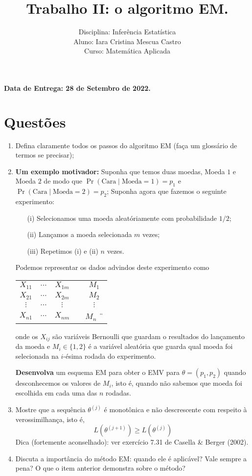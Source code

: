 \documentclass[a4paper,10pt, notitlepage]{report}
\title{Trabalho II: o algoritmo EM.}
\author{Disciplina: Inferência Estatística \\ Aluno: Iara Cristina Mescua Castro \\ Curso: Matemática Aplicada}
\begin{document}
	\maketitle
	
	\textbf{Data de Entrega: 28 de Setembro de 2022.}
	
	\section*{Questões}
	\begin{enumerate}
		\item Defina claramente todos os passos do algoritmo EM (faça um glossário de termos se precisar);
		\item \textbf{Um exemplo motivador:} Suponha que temos duas moedas, Moeda $1$ e Moeda $2$ de modo que $\operatorname{Pr}(\text{Cara} \mid \text{Moeda} = 1) = p_1$ e $\operatorname{Pr}(\text{Cara} \mid \text{Moeda} = 2) = p_2$; 
		Suponha agora que fazemos o seguinte experimento:
		\begin{itemize}
			\item[(i)] Selecionamos uma moeda aleatóriamente com probabilidade $1/2$;
			\item[(ii)] Lançamos a moeda selecionada $m$ vezes;
			\item[(iii)] Repetimos (i) e (ii) $n$ vezes.
		\end{itemize}
		Podemos representar os dados advindos deste experimento como 
		\begin{center}
			\begin{tabular}{ c c c c c}
				$X_{11}$ & $\ldots$ & $X_{1m}$ & & $M_1$  \\ 
				$X_{21}$ & $\ldots$ & $X_{2m}$ & & $M_2$  \\
				$\vdots$ & $\ldots$ & $\vdots$ & & $\vdots$  \\
				$X_{n1}$ & $\ldots$ & $X_{nm}$ & & $M_n$ ¨
			\end{tabular}
		\end{center}
		
		onde os $X_{ij}$ são variáveis Bernoulli que guardam o resultados do lançamento da moeda  e $M_i \in \{ 1, 2\}$ é a variável aleatória que guarda qual moeda foi selecionada na $i$-ésima rodada do experimento.
		
		\textbf{Desenvolva} um esquema EM para obter o EMV para $\theta = (p_1, p_2)$ quando desconhecemos os valores de $M_i$, isto é, quando não sabemos que moeda foi escolhida em cada uma das $n$ rodadas.
		
		\item Mostre que a sequência $\theta^{(j)}$ é monotônica e não descrescente com respeito à verossimilhança, isto é,
		\[ L\left(\theta^{(j + 1)}\right) \geq L\left(\theta^{(j)}\right) \]
		Dica (fortemente aconselhado): ver exercício 7.31 de Casella \& Berger (2002). 
		\item Discuta a importância do método EM: quando ele é aplicável? Vale sempre a pena? O que o item anterior demonstra sobre o método?
	\end{enumerate}
	\newpage
\end{document}
